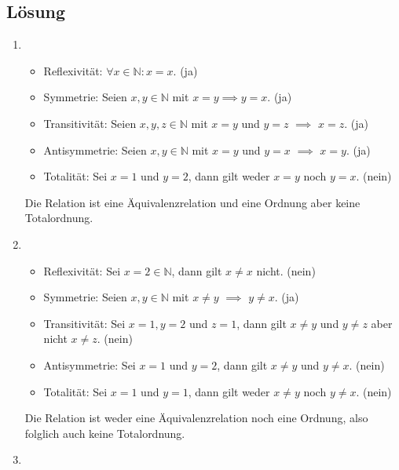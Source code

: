 \documentclass[german,12pt]{homework}
\newcommand{\NN}{\mathbb{N}}
\begin{document}
    \subsection*{Lösung}
    \begin{enumerate}
        \item\ \\
        \begin{itemize}
            \item Reflexivität: \({\forall}x \in \NN: x = x\). (ja)
            \item Symmetrie: Seien \(x, y \in \NN\) mit \(x = y \implies y =
            x\). (ja)
            \item Transitivität: Seien \(x, y, z \in \NN\) mit \(x = y\) und
            \(y = z\) \(\implies\) \(x = z\). (ja)
            \item Antisymmetrie: Seien \(x, y \in \NN\) mit \(x = y\) und \(y =
            x\) \(\implies\) \(x = y\). (ja)
            \item Totalität: Sei \(x = 1\) und \(y = 2\), dann gilt weder \(x =
            y\) noch \(y = x\). (nein)
    	\end{itemize}
    	Die Relation ist eine Äquivalenzrelation und eine Ordnung aber keine
        Totalordnung.
        \item\ \\
        \begin{itemize}
            \item Reflexivität: Sei \(x = 2 \in \NN\), dann gilt \(x \ne x\)
            nicht. (nein)
            \item Symmetrie: Seien \(x, y \in \NN\) mit \(x \ne y\)
            \(\implies\) \(y \ne x\). (ja)
            \item Transitivität: Sei \(x = 1, y = 2\) und \(z = 1\), dann gilt
            \(x \ne y\) und \(y \ne z\) aber nicht \(x \ne z\). (nein)
            \item Antisymmetrie: Sei \(x = 1\) und \(y = 2\), dann gilt \(x \ne
            y\) und \(y \ne x\). (nein)
            \item Totalität: Sei \(x = 1\) und \(y = 1\), dann gilt weder \(x
            \ne y\) noch \(y \ne x\). (nein)
    	\end{itemize}
    	Die Relation ist weder eine Äquivalenzrelation noch eine Ordnung, also
        folglich auch keine Totalordnung.
        \item\ \\
        \begin{itemize}

\end{itemize}
\end{enumerate}
\end{document}
